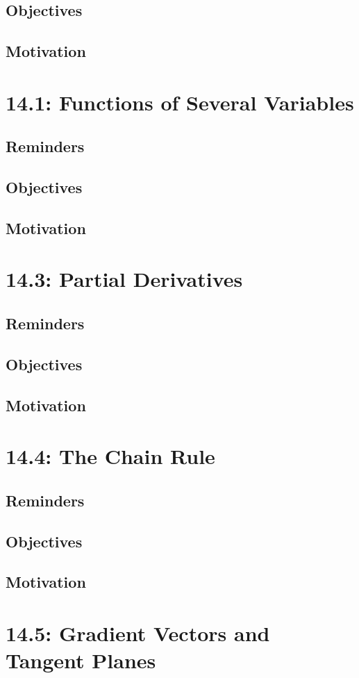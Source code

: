 \documentclass{report}
\begin{document}
\begin{sloppypar}
\section{Objectives}
\section{Motivation}
\chapter{14.1: Functions of Several Variables}
\section{Reminders}
\section{Objectives}
\section{Motivation}
\chapter{14.3: Partial Derivatives}
\section{Reminders}
\section{Objectives}
\section{Motivation}
\chapter{14.4: The Chain Rule}
\section{Reminders}
\section{Objectives}
\section{Motivation}
\chapter{14.5: Gradient Vectors and Tangent Planes}

\end{sloppypar}
\end{document}
